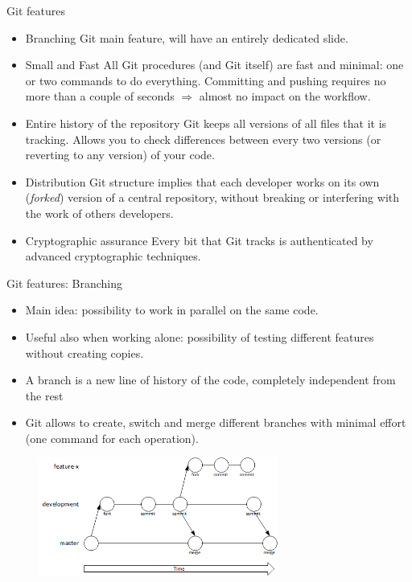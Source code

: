 \documentclass{beamer}
\newcommand{\git}{Git{}}
\begin{document}
\begin{frame}{\git{} features}
    \begin{itemize}
        \item \alert{Branching} \git{} main feature, will have an entirely dedicated slide.
        \item \alert{Small and Fast} All \git{} procedures (and \git{} itself) are fast and minimal: one or two commands to do everything. Committing and pushing requires no more than a couple of seconds $\Rightarrow$ almost no impact on the workflow.
        \item \alert{Entire history of the repository} \git{} keeps all versions of all files that it is tracking. Allows you to check differences between every two versions (or reverting to any version) of your code.
        \item \alert{Distribution} \git{} structure implies that each developer works on its own (\textit{forked}) version of a central repository, without breaking or interfering with the work of others developers.
        \item \alert{Cryptographic assurance} Every bit that \git{} tracks is authenticated by advanced cryptographic techniques.
    \end{itemize}
\end{frame}

\begin{frame}{\git{} features: Branching}
    \begin{itemize}
    \item Main idea: possibility to \alert{work in parallel} on the same code. 
    \item Useful also when working alone: possibility of \alert{testing different features} without creating copies. 
    \item A \alert{branch} is a new line of history of the code, completely independent from the rest
    \item \git{} allows to \alert{create}, \alert{switch} and \alert{merge} different branches with minimal effort (one command for each operation).
    \end{itemize}

    \begin{figure}
        \centering
        \includegraphics[width=0.7\textwidth]{git_workflow_1.png}
    \end{figure}
\end{frame}
\end{document}

